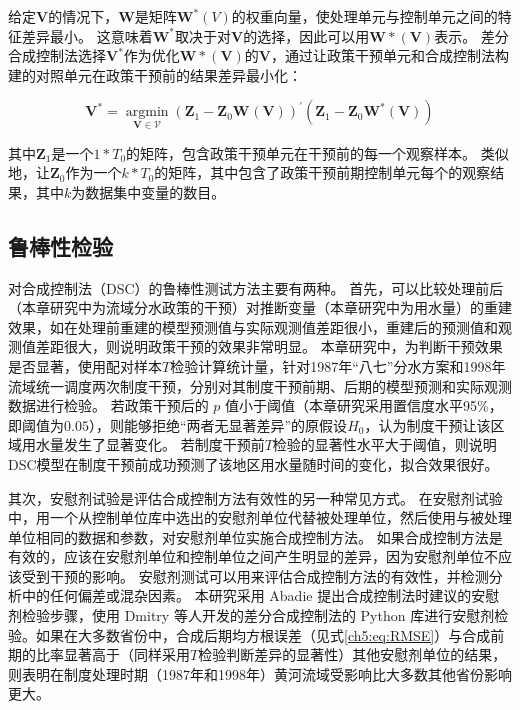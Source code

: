 给定$\mathbf{V}$的情况下，$\mathbf{W}$是矩阵$\mathbf{W}^{*}(V)$的权重向量，使处理单元与控制单元之间的特征差异最小。
这意味着$\mathbf{W^{*}}$取决于对$\mathbf{V}$的选择，因此可以用$\mathbf{W*(V)}$表示。
差分合成控制法选择$\mathbf{V^{*}}$作为优化$\mathbf{W*(V)}$的$\mathbf{V}$，通过让政策干预单元和合成控制法构建的对照单元在政策干预前的结果差异最小化：

\begin{equation}
    \mathbf{V}^{*}=\underset{\mathbf{V} \in \mathcal{V}}{\operatorname{argmin}}{\left(\mathbf{Z}_{1}-\mathbf{Z}_{0} \mathbf{W}^{}(\mathbf{V})\right)}^{\prime}{\left(\mathbf{Z}_{1}-\mathbf{Z}_{0} \mathbf{W}^{*}(\mathbf{V})\right)}
\end{equation}

其中$\mathbf{Z}_{1}$是一个$1*T_0$的矩阵，包含政策干预单元在干预前的每一个观察样本。
类似地，让$\mathbf{Z}_{0}$作为一个$k * T_0$的矩阵，其中包含了政策干预前期控制单元每个的观察结果，其中$k$为数据集中变量的数目。

\subsection{鲁棒性检验}

对合成控制法（DSC）的鲁棒性测试方法主要有两种。
首先，可以比较处理前后（本章研究中为流域分水政策的干预）对推断变量（本章研究中为用水量）的重建效果，如在处理前重建的模型预测值与实际观测值差距很小，重建后的预测值和观测值差距很大，则说明政策干预的效果非常明显。
本章研究中，为判断干预效果是否显著，使用配对样本$T$检验计算统计量，针对1987年``八七''分水方案和1998年流域统一调度两次制度干预，分别对其制度干预前期、后期的模型预测和实际观测数据进行检验。
若政策干预后的 $p$ 值小于阈值（本章研究采用置信度水平95\%，即阈值为$0.05$），则能够拒绝“两者无显著差异”的原假设$H_0$，认为制度干预让该区域用水量发生了显著变化。
若制度干预前$T$检验的显著性水平大于阈值，则说明DSC模型在制度干预前成功预测了该地区用水量随时间的变化，拟合效果很好。

其次，安慰剂试验是评估合成控制方法有效性的另一种常见方式。
在安慰剂试验中，用一个从控制单位库中选出的安慰剂单位代替被处理单位，然后使用与被处理单位相同的数据和参数，对安慰剂单位实施合成控制方法。
如果合成控制方法是有效的，应该在安慰剂单位和控制单位之间产生明显的差异，因为安慰剂单位不应该受到干预的影响。
安慰剂测试可以用来评估合成控制方法的有效性，并检测分析中的任何偏差或混杂因素。
本研究采用 Abadie 提出合成控制法时建议的安慰剂检验步骤\cite{abadie2010}，使用 Dmitry 等人开发的差分合成控制法的 Python 库进行安慰剂检验。如果在大多数省份中，合成后期均方根误差（见式\ref{ch5:eq:RMSE}）与合成前期的比率显著高于（同样采用$T$检验判断差异的显著性）其他安慰剂单位的结果，则表明在制度处理时期（1987年和1998年）黄河流域受影响比大多数其他省份影响更大。

